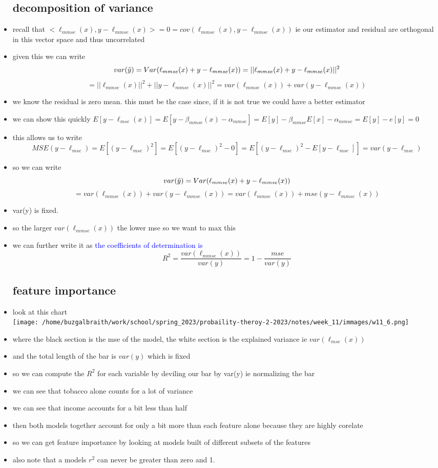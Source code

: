 \documentclass{article}
\begin{document}
\begin{itemize}
\subsection*{decomposition of variance}
\item recall that $<\ell_{mmse}(x), y-\ell_{mmse}(x)>=0=cov(\ell_{mmse}(x), y-\ell_{mmse}(x))$ ie our estimator and residual are orthogonal
in this vector space and thus uncorrelated
\item given this we can write $$var(\Tilde{y})=Var(\ell_{mmse}(x) + y-\ell_{mmse}(x))=||\ell_{mmse}(x) + y-\ell_{mmse}(x)||^2$$ 
$$=||\ell_{mmse}(x)||^2 + ||y-\ell_{mmse}(x)||^2=var(\ell_{mmse}(x)) + var(y-\ell_{mmse}(x))$$
\item we know the residual is zero mean. this must be the case since, if it is not true we could have a better estimator 
\item we can show this quickly $E[y-\ell_{mse}(x)]=E[y-\beta_{mmse}(x) -\alpha_{mmse}]=E[y]-\beta_{mmse}E[x] -\alpha_{mmse}
=E[y]-e[y]=0$
\item this allows us to write $$MSE(y-\ell_{mse})=E[(y-\ell_{mse})^2]=E[(y-\ell_{mse})^2-0]=E[(y-\ell_{mse})^2-E[y-\ell_{mse}]]=var(y-\ell_{mse})$$
\item so we can write $$var(\Tilde{y})=Var(\ell_{mmse}(x) + y-\ell_{mmse}(x))$$ $$=var(\ell_{mmse}(x)) + var(y-\ell_{mmse}(x))=var(\ell_{mmse}(x)) + mse(y-\ell_{mmse}(x))$$
\item var(y) is fixed. 
\item so the larger $var(\ell_{mmse}(x))$ the lower mse so we want to max this 
\item we can further write it as \textcolor{blue}{the coefficients of determination is }$$R^2=\frac{var(\ell_{mmse}(x))}{var(y)}=1-\frac{mse}{var(y)}$$
\subsection*{feature importance}
\item look at this chart \\ \texttt{[image: /home/buzgalbraith/work/school/spring\_2023/probaility-theroy-2-2023/notes/week\_11/immages/w11\_6.png]}
\item where the black section is the mse of the model, the white section is the explained variance ie $var(\ell_{mse}(x))$
\item and the total length of the bar is $var(y)$ which is fixed
\item so we can compute the $R^2$ for each variable by deviling our bar by var(y) ie normalizing the bar 
\item we can see that tobacco alone counts for a lot of variance
\item we can see that income accounts for a bit less than half 
\item then both models together account for only a bit more than each feature alone because they are highly corelate
\item so we can get feature importance by looking at models built of different subsets of the features
\item also note that a models $r^2$ can never be greater than zero and 1. 

\end{itemize}
\end{document}
